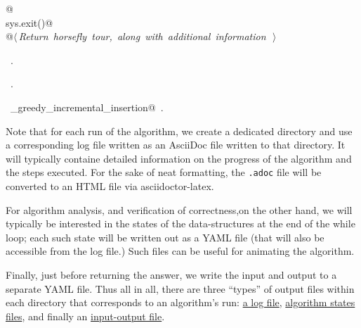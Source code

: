 \documentclass[11.5pt]{report}
\begin{document}
\begin{flushleft}
\begin{list}{}{}
\mbox{}\verb@      @\\
\mbox{}\verb@      sys.exit()@\\
\mbox{}\verb@      @\hbox{$\langle\,${\itshape Return horsefly tour, along with additional information}\nobreak\ {\footnotesize {}}$\,\rangle$}\verb@@\\
\mbox{}\verb@@{\NWsep}
\end{list}
\vspace{-1.5ex}
\footnotesize
\begin{list}{}{\setlength{\itemsep}{-\parsep}\setlength{\itemindent}{-\leftmargin}}
\item \NWtxtMacroDefBy\ .
\item \NWtxtMacroRefIn\ .
\item \NWtxtIdentsDefed\nobreak\  \verb@algo_greedy_incremental_insertion@\nobreak\ .
\item{}
\end{list}
\vspace{4ex}
\end{flushleft}
\newchunk Note that for each run of the algorithm, we create a dedicated directory and 
use a corresponding log file written as an AsciiDoc file written to that 
directory. It will typically containe detailed information on the progress 
of the algorithm and the steps executed. For the sake of neat formatting, 
the \verb|.adoc| file will be converted to an HTML file via 
asciidoctor-latex. 

For algorithm analysis, and verification of correctness,on the other hand, we will 
typically  be interested in the states of the data-structures at the end of 
the while loop; each such state will be written out as a YAML file (that 
will also be accessible from the log file.) Such files can be useful for animating 
the algorithm. 

Finally, just before returning the answer, we write the input and output 
to a separate YAML file. Thus all in all, there are three ``types'' of output files
within each directory that corresponds to an algorithm's run: 
\underline{a log file}, \underline{algorithm states files}, and finally 
an \underline{input-output file}. 
\end{document}
